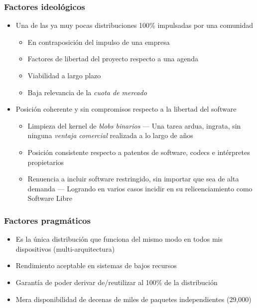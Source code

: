 \documentclass{beamer}
\begin{document}
\begin{frame}
  \frametitle {Factores ideológicos}
  \begin{itemize}
  \item Una de las ya muy pocas distribuciones 100\% impulsadas por
    una comunidad
    \begin{itemize}
      \item En contraposición del impulso de una empresa
      \item Factores de libertad del proyecto respecto a una agenda
      \item Viabilidad a largo plazo
      \item Baja relevancia de la {\em cuota de mercado}
    \end{itemize}
  \item Posición coherente y sin compromisos respecto a la libertad
    del software
    \begin{itemize}
      \item Limpieza del kernel de {\em blobs binarios} — Una tarea
        ardua, ingrata, sin ninguna {\em ventaja comercial} realizada
        a lo largo de años
      \item Posición consistente respecto a patentes de software,
        codecs e intérpretes propietarios
      \item Renuencia a incluir software restringido, sin importar que
        sea de alta demanda — Logrando en varios casos incidir en su
        relicenciamiento como Software Libre
    \end{itemize}
  \end{itemize}
\end{frame}

\begin{frame}
  \frametitle {Factores pragmáticos}
  \begin{itemize}
  \item Es la única distribución que funciona del mismo modo en todos
    mis dispositivos (multi-arquitectura)
  \item Rendimiento aceptable en sistemas de bajos recursos
  \item Garantía de poder derivar de/reutilizar al 100\% de la
    distribución
  \item Mera disponibilidad de decenas de miles de paquetes
    independientes (29,000)
  \end{itemize}
\end{frame}
\end{document}
